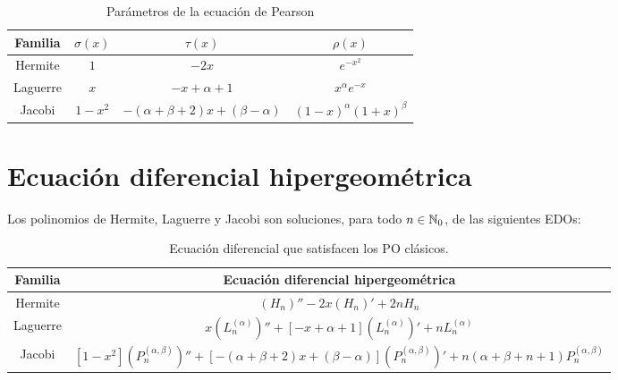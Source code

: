 \begin{table}[h]
    \centering
    \begin{tabular}{cccc}
    \hline
    \textbf{Familia} & \textbf{$\sigma(x)$} & \textbf{$\tau(x)$} & \textbf{$\rho(x)$}            \\ \hline\hline
    Hermite          & $1$                  & $-2x$                               & $e^{-x^2}$                    \\ \hline
    Laguerre         & $x$                  & $-x+\alpha+1$                       & $x^{\alpha} e^{-x}$           \\ \hline
    Jacobi           & $1-x^2$              & $-(\alpha+\beta+2)x+(\beta-\alpha)$ & $(1-x)^{\alpha}(1+x)^{\beta}$ \\ \hline
    \end{tabular}
    \caption{Parámetros de la ecuación de Pearson}
    \label{tab:Pearson}
\end{table}

\section{Ecuación diferencial hipergeométrica}

Los polinomios de Hermite, Laguerre y Jacobi son soluciones, para todo $n\in\mathbb{N}_0$, de las siguientes EDOs:

\begin{table}[h]
    \centering
    \begin{tabular}{cc}
    \hline
    \textbf{Familia} & \textbf{Ecuación diferencial hipergeométrica}                                                                                                 \\ \hline\hline
    Hermite          & $(H_n)'' -2x(H_n)' +2nH_n$                                                                                                           \\ \hline
    Laguerre         & $x(L_n^{(\alpha)})''+[-x+\alpha+1](L_n^{(\alpha)})' +nL_n^{(\alpha)}$                                                                 \\ \hline
    Jacobi           & $[1-x^2](P_n^{(\alpha,\beta)})''+[-(\alpha+\beta+2)x+(\beta-\alpha)](P_n^{(\alpha,\beta)})'+n(\alpha+\beta+n+1)P_n^{(\alpha,\beta)}$ \\ \hline
    \end{tabular}
    \caption{Ecuación diferencial que satisfacen los PO clásicos.}
    \label{tab:EDO}
    \end{table}

